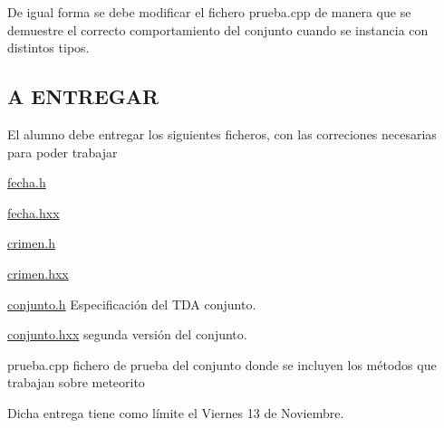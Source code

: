 De igual forma se debe modificar el fichero prueba.\+cpp de manera que se demuestre el correcto comportamiento del conjunto cuando se instancia con distintos tipos.\hypertarget{index_entrega}{}\subsection{A E\+N\+T\+R\+E\+G\+A\+R}\label{index_entrega}
El alumno debe entregar los siguientes ficheros, con las correciones necesarias para poder trabajar \begin{DoxyItemize}
\item \hyperlink{fecha_8h_source}{fecha.\+h} \item \hyperlink{fecha_8hxx_source}{fecha.\+hxx} \item \hyperlink{crimen_8h_source}{crimen.\+h} \item \hyperlink{crimen_8hxx_source}{crimen.\+hxx} \item \hyperlink{conjunto_8h_source}{conjunto.\+h} Especificación del T\+D\+A conjunto. \item \hyperlink{conjunto_8hxx_source}{conjunto.\+hxx} segunda versión del conjunto. \item prueba.\+cpp fichero de prueba del conjunto donde se incluyen los métodos que trabajan sobre meteorito\end{DoxyItemize}
Dicha entrega tiene como límite el Viernes 13 de Noviembre. 